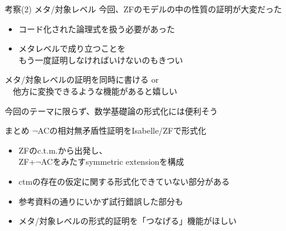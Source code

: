 \documentclass[17pt,aspectratio=169]{beamer}
\begin{document}
\begin{frame}{考察(2) メタ/対象レベル}
    今回、ZFのモデルの中の性質の証明が大変だった
    {\small 
    \begin{itemize}[itemsep=5pt]
        \item コード化された論理式を扱う必要があった
        \item メタレベルで成り立つことを\\
              もう一度証明しなければいけないのもきつい
    \end{itemize}}

    \textcolor{red}{\blacktriangleright}{\small 
    メタ/対象レベルの証明を同時に書ける or\\
    \,\,\,\,\,\,他方に変換できるような機能があると嬉しい}

    \textcolor{red}{\blacktriangleright}{\small 
    今回のテーマに限らず、数学基礎論の形式化には便利そう} 
\end{frame}

\begin{frame}{まとめ}
    $\neg$ACの相対無矛盾性証明をIsabelle/ZFで形式化
    {\small
    \begin{itemize}[itemsep=8pt]
        \item ZFのc.t.m.から出発し、\\ZF+$\neg$ACをみたすsymmetric extensionを構成
        \item ctmの存在の仮定に関する形式化できていない部分がある
        \item 参考資料の通りにいかず試行錯誤した部分も
        \item メタ/対象レベルの形式的証明を「つなげる」機能がほしい
    \end{itemize}
    }
\end{frame}
\end{document}
